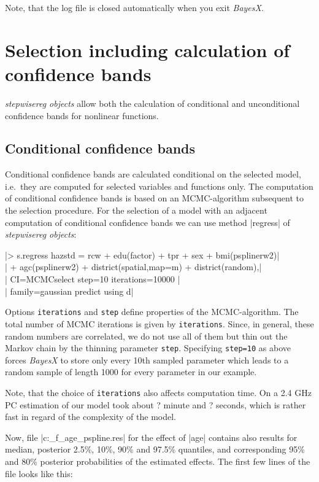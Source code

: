 Note, that the log file is closed automatically when you exit {\it BayesX}.


\section{Selection including calculation of confidence bands}\label{step:confidence}

{\it stepwisereg objects} allow both the calculation of conditional and unconditional confidence bands for nonlinear functions.

\subsection{Conditional confidence bands}\label{step:cond}

Conditional confidence bands are calculated conditional on the selected model, i.e.~they are computed for selected variables
and functions only. The computation of conditional confidence bands is based on an  MCMC-algorithm subsequent to the
selection procedure. For the selection of a model with an adjacent computation of conditional confidence bands we can use
method |regress| of {\it stepwisereg objects}:

 |> s.regress hazstd = rcw + edu(factor) + tpr + sex + bmi(psplinerw2)|\\
 |  + agc(psplinerw2) + district(spatial,map=m) + district(random),|\\
 |  CI=MCMCselect step=10 iterations=10000 |\\
 |  family=gaussian predict using d|

Options {\tt iterations} and {\tt step} define properties of the MCMC-algorithm. The total number of MCMC iterations is given
by {\tt iterations}. Since, in general, these random numbers are correlated, we do not use all of them but thin out the Markov
chain by the thinning parameter {\tt step}. Specifying {\tt step=10} as above forces {\it BayesX} to store only every 10th
sampled parameter which leads to a random sample of length 1000 for every parameter in our example.

Note, that the choice of {\tt iterations} also affects computation time. On a 2.4 GHz PC estimation of our model took about ?
minute and ? seconds, which is rather fast in regard of the complexity of the model.

Now, file |c:\data\s_f_age_pspline.res| for the effect of |age| contains also results for median, posterior 2.5\%, 10\%, 90\%
and 97.5\% quantiles, and corresponding 95\% and 80\% posterior probabilities of the estimated effects. The first few lines  of the
file looks like this:


